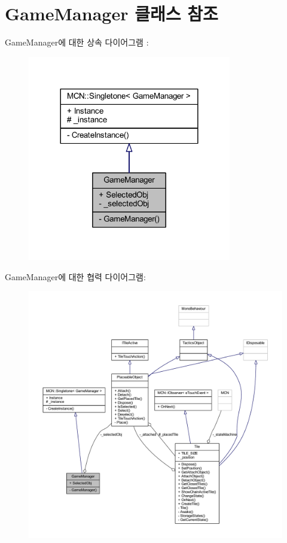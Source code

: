\hypertarget{class_game_manager}{}\section{Game\+Manager 클래스 참조}
\label{class_game_manager}


Game\+Manager에 대한 상속 다이어그램 \+: \nopagebreak
\begin{figure}[H]
\begin{center}
\leavevmode
\includegraphics[width=252pt]{class_game_manager__inherit__graph}
\end{center}
\end{figure}


Game\+Manager에 대한 협력 다이어그램\+:\nopagebreak
\begin{figure}[H]
\begin{center}
\leavevmode
\includegraphics[width=350pt]{class_game_manager__coll__graph}
\end{center}
\end{figure}
